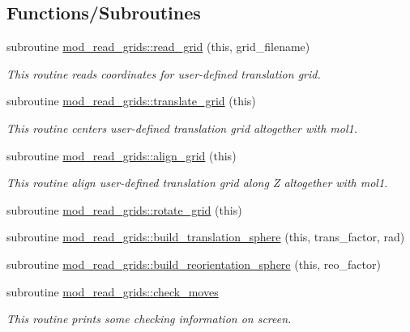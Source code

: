 \subsection*{Functions/\+Subroutines}
\begin{DoxyCompactItemize}
\item 
subroutine \hyperlink{namespacemod__read__grids_aef0317c21ab86e2e970824fb37f613e7}{mod\+\_\+read\+\_\+grids\+::read\+\_\+grid} (this, grid\+\_\+filename)
\begin{DoxyCompactList}\small\item\em This routine reads coordinates for user-\/defined translation grid. \end{DoxyCompactList}\item 
subroutine \hyperlink{namespacemod__read__grids_ac22d113a654f79569a6fe3d747c7676e}{mod\+\_\+read\+\_\+grids\+::translate\+\_\+grid} (this)
\begin{DoxyCompactList}\small\item\em This routine centers user-\/defined translation grid altogether with mol1. \end{DoxyCompactList}\item 
subroutine \hyperlink{namespacemod__read__grids_a09768b7e5dbb3769d5babf64f3e9d81e}{mod\+\_\+read\+\_\+grids\+::align\+\_\+grid} (this)
\begin{DoxyCompactList}\small\item\em This routine align user-\/defined translation grid along Z altogether with mol1. \end{DoxyCompactList}\item 
subroutine \hyperlink{namespacemod__read__grids_a8da3c9d08e5085b9badea630f01b0666}{mod\+\_\+read\+\_\+grids\+::rotate\+\_\+grid} (this)
\item 
subroutine \hyperlink{namespacemod__read__grids_a4285bde2d44b92f9fcc792dfeebb1eae}{mod\+\_\+read\+\_\+grids\+::build\+\_\+translation\+\_\+sphere} (this, trans\+\_\+factor, rad)
\item 
subroutine \hyperlink{namespacemod__read__grids_aa9f66d2873344e2a319f7eddb09df558}{mod\+\_\+read\+\_\+grids\+::build\+\_\+reorientation\+\_\+sphere} (this, reo\+\_\+factor)
\item 
subroutine \hyperlink{namespacemod__read__grids_a318177c120a409fe4cef7d1785b626ac}{mod\+\_\+read\+\_\+grids\+::check\+\_\+moves}
\begin{DoxyCompactList}\small\item\em This routine prints some checking information on screen. \end{DoxyCompactList}\end{DoxyCompactItemize}
